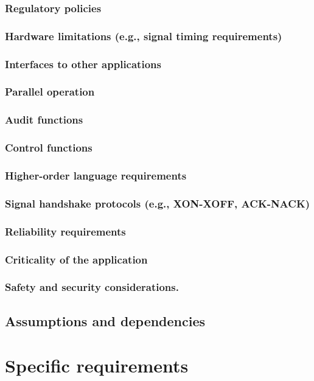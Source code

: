 \documentclass[draftclsnofoot,onecolumn,letterpaper,10pt,compsoc]{IEEEtran}
\begin{document}
		\subsubsection{Regulatory policies}
		\subsubsection{Hardware limitations (e.g., signal timing requirements)}
		\subsubsection{Interfaces to other applications}
		\subsubsection{Parallel operation}
		\subsubsection{Audit functions}
		\subsubsection{Control functions}
		\subsubsection{Higher-order language requirements}
		\subsubsection{Signal handshake protocols (e.g., XON-XOFF, ACK-NACK)}
		\subsubsection{Reliability requirements}
		\subsubsection{Criticality of the application}
		\subsubsection{Safety and security considerations.}
	\subsection{Assumptions and dependencies}

\section{Specific requirements}
\end{document}
